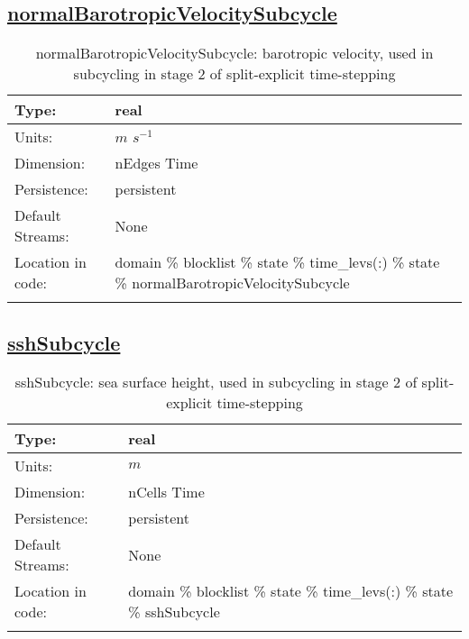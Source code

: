 \subsection[normalBarotropicVelocitySubcycle]{\hyperref[sec:var_tab_state]{normalBarotropicVelocitySubcycle}}
\label{subsec:var_sec_state_normalBarotropicVelocitySubcycle}
\begin{center}
\begin{longtable}{| p{2.0in} | p{4.0in} |}
        \hline 
        Type: & real \\
        \hline 
        Units: & $m$ $s^{-1}$ \\
        \hline 
        Dimension: & nEdges Time \\
        \hline 
        Persistence: & persistent \\
        \hline 
		 Default Streams: & None \\
        \hline 
		 Location in code: & domain \% blocklist \% state \% time\_levs(:) \% state \% normalBarotropicVelocitySubcycle \\
		 \hline 
    \caption{normalBarotropicVelocitySubcycle: barotropic velocity, used in subcycling in stage 2 of split-explicit time-stepping}
\end{longtable}
\end{center}
\subsection[sshSubcycle]{\hyperref[sec:var_tab_state]{sshSubcycle}}
\label{subsec:var_sec_state_sshSubcycle}
\begin{center}
\begin{longtable}{| p{2.0in} | p{4.0in} |}
        \hline 
        Type: & real \\
        \hline 
        Units: & $m$ \\
        \hline 
        Dimension: & nCells Time \\
        \hline 
        Persistence: & persistent \\
        \hline 
		 Default Streams: & None \\
        \hline 
		 Location in code: & domain \% blocklist \% state \% time\_levs(:) \% state \% sshSubcycle \\
		 \hline 
    \caption{sshSubcycle: sea surface height, used in subcycling in stage 2 of split-explicit time-stepping}
\end{longtable}
\end{center}
